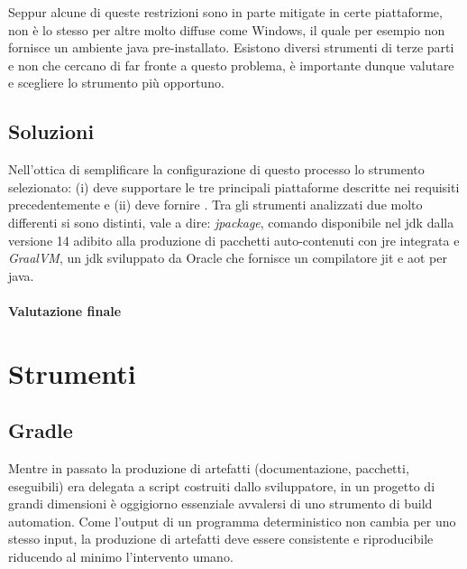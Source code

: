 Seppur alcune di queste restrizioni sono in parte mitigate in certe piattaforme, non è lo stesso per altre molto diffuse come Windows, il quale per esempio non fornisce un ambiente java pre-installato. Esistono diversi strumenti di terze parti e non che cercano di far fronte a questo problema, è importante dunque valutare e scegliere lo strumento più opportuno.

\subsection{Soluzioni}

Nell'ottica di semplificare la configurazione di questo processo lo strumento selezionato: (i) deve supportare le tre principali piattaforme descritte nei requisiti precedentemente e (ii) deve fornire . Tra gli strumenti analizzati due molto differenti si sono distinti, vale a dire: \textit{jpackage}, comando disponibile nel \ac{jdk} dalla versione 14 adibito alla produzione di pacchetti auto-contenuti con \ac{jre} integrata e \textit{GraalVM}, un \ac{jdk} sviluppato da Oracle che fornisce un compilatore \ac{jit} e \ac{aot} per java. 
\paragraph{Valutazione finale}

\section{Strumenti}

\subsection{Gradle}

Mentre in passato la produzione di artefatti (documentazione, pacchetti, eseguibili) era delegata a script costruiti dallo sviluppatore, in un progetto di grandi dimensioni è oggigiorno essenziale avvalersi di uno strumento di build automation. Come l'output di un programma deterministico non cambia per uno stesso input, la produzione di artefatti deve essere consistente e riproducibile riducendo al minimo l'intervento umano. 

